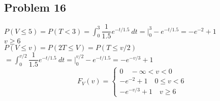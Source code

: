 \documentclass{article}
\begin{document}
\begin{flushleft}
\section*{Problem 16}
$P(V\leq 5)=P(T< 3)=\int_{0}^{3}\dfrac{1}{1.5}e^{-t/1.5}\ dt=\big|_0^3 -e^{-t/1.5}=-e^{-2}+1$\\
$v\geq 6$\\
$P(V\leq v)=P(2T\leq V)= P(T\leq v/2)$\\
$=\int_{0}^{v/2}\dfrac{1}{1.5}e^{-t/1.5}\ dt=\big|_0^{v/2} -e^{-t/1.5}=-e^{-v/3}+1$\\
\[F_V(v)=\begin{cases}
0 \quad -\infty<v<0\\
-e^{-2}+1 \quad 0\leq v<6\\
-e^{-v/3}+1 \quad v\geq 6
\end{cases}
\]
\end{flushleft}
\end{document}
